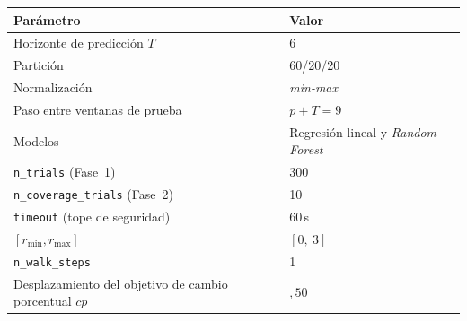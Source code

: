 \documentclass[12pt]{report} %
\begin{document}
\begin{table}[H]
    {\begin{tabular}{|p{6.2cm}|p{5.8cm}|}
            \hline
            \textbf{Parámetro}                                    & \textbf{Valor}                                                  \\
            \hline
            Horizonte de predicción $T$                           & 6                                                               \\
            \hline
            Partición                                             & 60/20/20                                                        \\
            \hline
            Normalización                                         & \textit{min-max}                                                \\
            \hline
            Paso entre ventanas de prueba                         & $p + T = 9$                                                     \\
            \hline
            Modelos                                               & Regresión lineal y \textit{Random Forest}                       \\
            \hline
            \texttt{n\_trials} (Fase~1)                           & 300                                                             \\
            \hline
            \texttt{n\_coverage\_trials} (Fase~2)                 & 10                                                              \\
            \hline
            \texttt{timeout} (tope de seguridad)                  & 60\,s                                                           \\
            \hline
            $[r_{\min}, r_{\max}]$                                & $[0,\ 3]$                                                       \\
            \hline
            \texttt{n\_walk\_steps}                               & 1                                                               \\
            \hline
            Desplazamiento del objetivo de cambio porcentual $cp$ & ${,}50$                                                         \\
            \hline

\end{tabular}}
\end{table}
\end{document}

